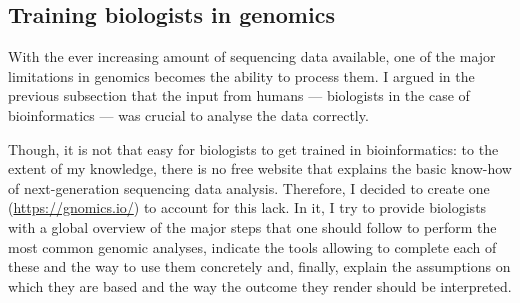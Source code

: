 %
%



\subsection{Training biologists in genomics}

With the ever increasing amount of sequencing data available, one of the major limitations in genomics becomes the ability to process them.
I argued in the previous subsection that the input from humans — biologists in the case of bioinformatics — was crucial to analyse the data correctly.

Though, it is not that easy for biologists to get trained in bioinformatics: to the extent of my knowledge, there is no free website that explains the basic know-how of next-generation sequencing data analysis.
Therefore, I decided to create one (\url{https://gnomics.io/}) to account for this lack.
In it, I try to provide biologists with a global overview of the major steps that one should follow to perform the most common genomic analyses, indicate the tools allowing to complete each of these and the way to use them concretely and, finally, explain the assumptions on which they are based and the way the outcome they render should be interpreted.

